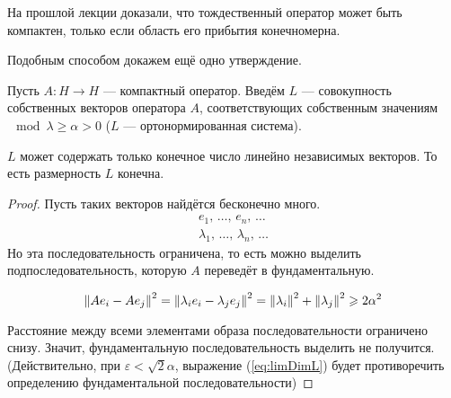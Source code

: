 \documentclass[12pt]{article}
\begin{document}
	На прошлой лекции доказали, что тождественный оператор может быть компактен, только если область его прибытия конечномерна.
	
	Подобным способом докажем ещё одно утверждение.
	
	Пусть $A: H \rightarrow H$ --- компактный оператор. Введём $L$ --- совокупность собственных векторов 
	оператора $A$, соответствующих собственным значениям $\mod{\lambda} \geq \alpha > 0$ 
	($L$ --- ортонормированная система).
	\begin{state} \label{st:limLambda}	
		$L$ может содержать только конечное число {\color{gray}линейно независимых} векторов.		
		{\color{gray} То есть размерность $L$ конечна.}
	\end{state}
	\begin{proof}
		Пусть таких векторов найдётся бесконечно много.
		\begin{gather*}
		 	e_1      ,\, \dots,\, e_n      ,\, \dots \\
			\lambda_1,\, \dots,\, \lambda_n,\, \dots
		\end{gather*}
		Но эта последовательность ограничена, то есть можно выделить подпоследовательность, которую $A$ переведёт в фундаментальную.
		
		\begin{equation} \label{eq:limDimL}
			\left\| Ae_i - Ae_j \right\|^2 = \left\| \lambda_ie_i - \lambda_je_j \right\|^2 = \left\| \lambda_i \right\|^2 + \left\| \lambda_j \right\|^2 \geqslant 2\alpha^2
		\end{equation}
		
		Расстояние между всеми элементами образа последовательности ограничено снизу. Значит, фундаментальную последовательность
		выделить не получится. \color{gray}(Действительно, при $\varepsilon < \sqrt{2}\alpha$, выражение (\ref{eq:limDimL}) будет 
		противоречить определению фундаментальной последовательности)
	\end{proof}
	
\end{document}
